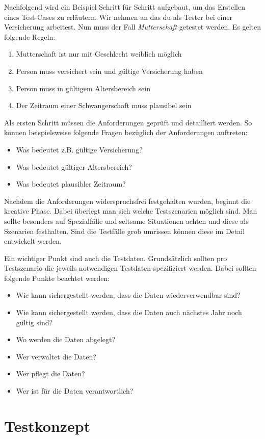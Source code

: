 Nachfolgend wird ein Beispiel Schritt für Schritt aufgebaut, um das Erstellen eines Test-Cases zu erläutern. Wir nehmen an das du als Tester bei einer Versicherung arbeitest. Nun muss der Fall \textit{Mutterschaft} getestet werden. Es gelten folgende Regeln:
\begin{enumerate}
	\item Mutterschaft ist nur mit Geschlecht weiblich möglich
	\item Person muss versichert sein und gültige Versicherung haben
	\item Person muss in gültigem Altersbereich sein
	\item Der Zeitraum einer Schwangerschaft muss plausibel sein
\end{enumerate}
Als ersten Schritt müssen die Anforderungen geprüft und detailliert werden. So können beispielsweise folgende Fragen bezüglich der Anforderungen auftreten:
\begin{itemize}
	\item Was bedeutet z.B. gültige Versicherung?
	\item Was bedeutet gültiger Altersbereich?
	\item Was bedeutet plausibler Zeitraum?
\end{itemize}
Nachdem die Anforderungen widerspruchsfrei festgehalten wurden, beginnt die kreative Phase. Dabei überlegt man sich welche Testszenarien möglich sind. Man sollte besonders auf Spezialfälle und seltsame Situationen achten und diese als Szenarien festhalten. Sind die Testfälle grob umrissen können diese im Detail entwickelt werden.

Ein wichtiger Punkt sind auch die Testdaten. Grundsätzlich sollten pro Testszenario die jeweils notwendigen Testdaten spezifiziert werden. Dabei sollten folgende Punkte beachtet werden:
\begin{itemize}
	\item Wie kann sichergestellt werden, dass die Daten wiederverwendbar sind?
	\item Wie kann sichergestellt werden, dass die Daten auch nächstes Jahr noch gültig sind?
	\item Wo werden die Daten abgelegt?
	\item Wer verwaltet die Daten?
	\item Wer pflegt die Daten?
	\item Wer ist für die Daten verantwortlich?
\end{itemize}

\section{Testkonzept}


